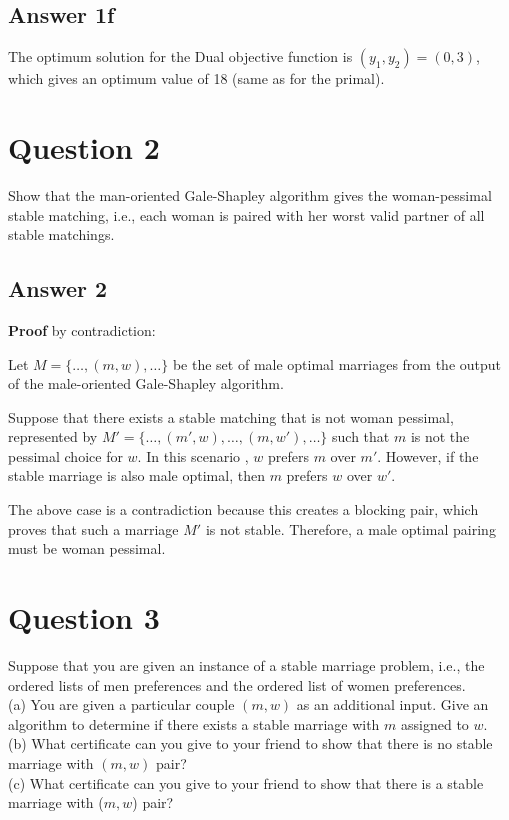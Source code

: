 \documentclass[twoside]{article}
\begin{document}
\subsection{Answer 1f}

The optimum solution for the Dual objective function is $(y_{1}, y_{2}) = (0, 3)$, which gives an optimum value of 18 (same as for the primal).

\section{Question 2}
Show that the man-oriented Gale-Shapley algorithm gives the woman-pessimal stable matching, i.e., each woman is paired with her worst valid partner of all stable matchings. 

\subsection{Answer 2}

\textbf{Proof} by contradiction:

Let $M = \{ \ldots, (m, w), \ldots \}$ be the set of male optimal marriages from the output of the male-oriented Gale-Shapley algorithm. 

Suppose that there exists a stable matching that is not woman pessimal, represented by $M' = \{ \ldots, (m', w), \ldots, (m, w'), \ldots\}$ such that $m$ is not the pessimal choice for $w$. In this scenario , $w$ prefers $m$ over $m'$. However, if the stable marriage is also male optimal, then $m$ prefers $w$ over $w'$. 

The above case is a contradiction because this creates a blocking pair, which proves that such a marriage $M'$ is not stable. Therefore, a male optimal pairing must be woman pessimal.


\section{Question 3}
Suppose that you are given an instance of a stable marriage problem, i.e., the ordered lists of men preferences and the ordered list of women preferences.\\

(a) You are given a particular couple $(m, w)$ as an additional input. Give an algorithm to determine if there exists a stable marriage with $m$ assigned to $w$.\\
(b) What certificate can you give to your friend to show that there is no stable marriage with $(m, w)$ pair?\\
(c) What certificate can you give to your friend to show that there is a stable marriage with ($m, w$) pair?
\end{document}
